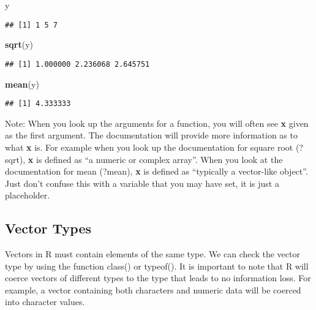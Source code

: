 \documentclass[]{article}
\newenvironment{Shaded}{\begin{snugshade}}{\end{snugshade}}
\newcommand{\KeywordTok}[1]{\textcolor[rgb]{0.13,0.29,0.53}{\textbf{#1}}}
\newcommand{\NormalTok}[1]{#1}
\begin{document}
\begin{Shaded}
\begin{Highlighting}[]
\NormalTok{y}
\end{Highlighting}
\end{Shaded}

\begin{verbatim}
## [1] 1 5 7
\end{verbatim}

\begin{Shaded}
\begin{Highlighting}[]
\KeywordTok{sqrt}\NormalTok{(y)}
\end{Highlighting}
\end{Shaded}

\begin{verbatim}
## [1] 1.000000 2.236068 2.645751
\end{verbatim}

\begin{Shaded}
\begin{Highlighting}[]
\KeywordTok{mean}\NormalTok{(y)}
\end{Highlighting}
\end{Shaded}

\begin{verbatim}
## [1] 4.333333
\end{verbatim}

Note: When you look up the arguments for a function, you will often see
\textbf{x} given as the first argument. The documentation will provide
more information as to what \textbf{x} is. For example when you look up
the documentation for square root (?sqrt), \textbf{x} is defined as ``a
numeric or complex array''. When you look at the documentation for mean
(?mean), \textbf{x} is defined as ``typically a vector-like object''.
Just don't confuse this with a variable that you may have set, it is
just a placeholder.

\subsection{Vector Types}\label{vector-types}

Vectors in R must contain elements of the same type. We can check the
vector type by using the function class() or typeof(). It is important
to note that R will coerce vectors of different types to the type that
leads to no information loss. For example, a vector containing both
characters and numeric data will be coerced into character values.
\end{document}
